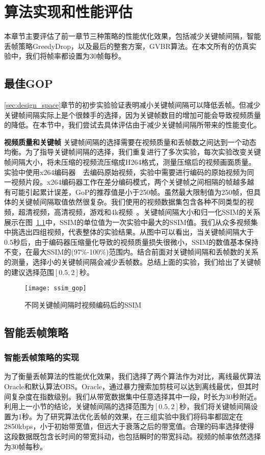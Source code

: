 \chapter{算法实现和性能评估}
本章节主要评估了前一章节三种策略的性能优化效果，包括减少关键帧间隔，智能丢帧策略GreedyDrop，以及最后的整套方案，GVBR算法。在本文所有的仿真实验中，我们将帧率都设置为30帧每秒。

\section{最佳GOP}
\ref{sec:design_space}章节的初步实验验证表明减小关键帧间隔可以降低丢帧。但减少关键帧间隔实际上是个很棘手的选择，因为关键帧数目的增加可能会导致视频质量的降低。在本节中，我们尝试去具体评估由于减少关键帧间隔所带来的性能变化。

\textbf{视频质量和关键帧} 关键帧间隔的选择需要在视频质量和丢帧数之间达到一个动态均衡。为了指导关键帧间隔的选择，我们重复进行了多次实验，每次实验改变关键帧间隔大小，将未压缩的视频流压缩成H264格式，测量压缩后的视频画面质量。实验中使用x264编码器~\cite{x264}~\cite{lai2017furion}去编码原始视频，实验中需要进行编码的原始视频为同一视频片段。x264编码器工作在差分编码模式，两个关键帧之间相隔的帧越多越有可能引起累计误差，GoP的推荐值是小于250帧。虽然最大限制值为250帧，但具体的关键帧间隔取值依然很复杂。我们使用的视频数据集包含各种不同类型的视频，超清视频，高清视频，游戏和4k视频~\cite{video}。关键帧间隔大小和归一化SSIM的关系展示在图~\ref{fig:ssim_gop}中，SSIM的单位值为一次实验中最大的SSIM值。我们从众多视频集中挑选出四组视频，代表整体的实验结果。从图中可以看出，当关键帧间隔大于0.5秒后，由于编码器压缩量化导致的视频质量损失很微小，SSIM的数值基本保持不变，在最大SSIM的(97\%-100\%)范围内。结合前面对关键帧间隔和丢帧数的关系的测量，选择小的关键帧间隔会减少丢帧数。总结上面的实验，我们给出了关键帧的建议选择范围$[0.5,2]$秒。

\begin{figure}[htb]%
  \centering
  \texttt{[image: ssim\_gop]}
  \caption{不同关键帧间隔时视频编码后的SSIM}
  \label{fig:ssim_gop}
\end{figure}

\section{智能丢帧策略}
\subsection{智能丢帧策略的实现}
为了衡量丢帧算法的性能优化效果，我们选择了两个算法作为对比，离线最优算法Oracle和默认算法OBS。Oracle，通过暴力搜索加剪枝可以达到离线最优，但其时间复杂度在指数级别。我们从带宽数据集中任意选择其中一段，时长为30秒附近。利用上一小节的结论，关键帧间隔的选择范围为$[0.5,2]$秒，我们将关键帧间隔设置为1秒。为了研究算法优化丢帧的效果，在三组实验中我们将码率都固定在2850kbps，小于初始带宽值，但远大于衰落之后的带宽值。合理的码率选择使得这段数据既包含长时间的带宽抖动，也包括瞬时的带宽抖动。视频的帧率依然选择为30帧每秒。

